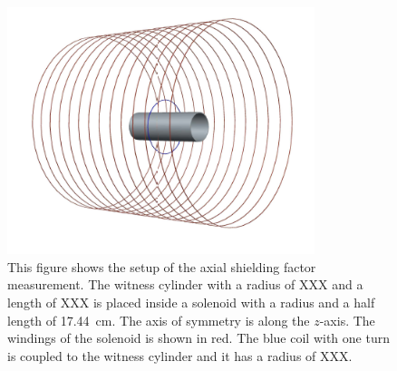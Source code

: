 \documentclass[review]{elsarticle}
\begin{document}
\begin{figure}[h!]
\begin{center}
   \includegraphics[width=0.8\textwidth]{geometry.PNG}
    \caption{This figure shows the setup of the axial shielding factor
      measurement. The witness cylinder with a radius of XXX and a
      length of XXX is placed inside a solenoid with a radius and a
      half length of 17.44~cm. The axis of symmetry is along the
      $z$-axis. The windings of the solenoid is shown in red. The blue
      coil with one turn is coupled to the witness cylinder and it has
      a radius of XXX.  }
    \label{fig:geometry}
    \end{center}
\end{figure}
\end{document}
